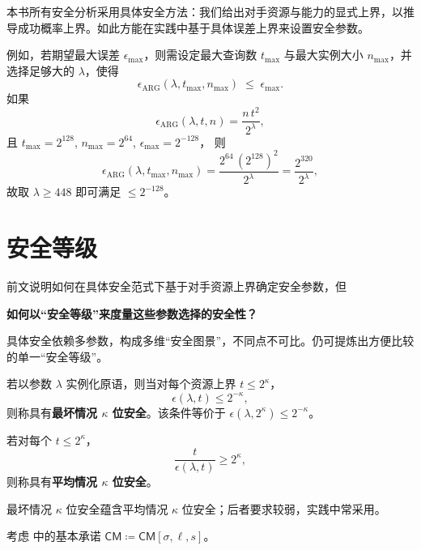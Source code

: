 \documentclass[american,singlepageview]{snargs-book-zh}
\newcommand{\DefineEqual}{\coloneqq}
\newcommand{\InstanceSize}{n}
\newcommand{\ProtoSoundnessError}{\epsilon}
\newcommand{\ARGSubscript}{\scriptscriptstyle\mathrm{ARG}}
\newcommand{\ARGSoundnessError}{\ProtoSoundnessError_{\ARGSubscript}}
\newcommand{\ROQueryBound}{t}
\newcommand{\SecurityParameter}{\lambda}
\newcommand{\ROOutputSize}{\sigma}
\newcommand{\SecurityLevel}{\kappa}
\newcommand{\ResourceBound}{t}
\newcommand{\ErrorBound}{\epsilon}
\newcommand{\CMSymbol}{\mathsf{CM}}
\newcommand{\CMConstructor}[3]{\CMSymbol[#1,#2,#3]}
\newcommand{\CMMessageLength}{\ell}
\newcommand{\CMSaltSize}{s}
\begin{document}
本书所有安全分析采用具体安全方法：我们给出对手资源与能力的显式上界，以推导成功概率上界。如此方能在实践中基于具体误差上界来设置安全参数。

例如，若期望最大误差 $\ErrorBound_{\max}$，则需设定最大查询数 $\ROQueryBound_{\max}$ 与最大实例大小 $\InstanceSize_{\max}$，并选择足够大的 $\SecurityParameter$，使得
\[
\ARGSoundnessError(\SecurityParameter,\ROQueryBound_{\max},\InstanceSize_{\max})
\;\le\;\ErrorBound_{\max}.
\]
如果
\[
\ARGSoundnessError(\SecurityParameter,\ROQueryBound,\InstanceSize)
=\frac{\InstanceSize\,\ROQueryBound^2}{2^{\SecurityParameter}},
\]
且
$\ROQueryBound_{\max}=2^{128}$,
$\InstanceSize_{\max}=2^{64}$,
$\ErrorBound_{\max}=2^{-128}$，
则
\[
\ARGSoundnessError(\SecurityParameter,\ROQueryBound_{\max},\InstanceSize_{\max})
=\frac{2^{64}\,(2^{128})^2}{2^{\SecurityParameter}}
=\frac{2^{320}}{2^{\SecurityParameter}},
\]
故取 $\SecurityParameter\ge448$ 即可满足 $\le2^{-128}$。

\section{安全等级}
\label{section:security-levels}

前文说明如何在具体安全范式下基于对手资源上界确定安全参数，但
\begin{center}
\textbf{如何以“安全等级”来度量这些参数选择的安全性？}
\end{center}

具体安全依赖多参数，构成多维“安全图景”，不同点不可比。仍可提炼出方便比较的单一“安全等级”。

若以参数 $\SecurityParameter$ 实例化原语，则当对每个资源上界 $\ResourceBound\le2^{\SecurityLevel}$，
\[
\ErrorBound(\SecurityParameter,\ResourceBound)\le2^{-\SecurityLevel},
\]
则称具有\textbf{最坏情况 $\SecurityLevel$ 位安全}。该条件等价于
$\ErrorBound(\SecurityParameter,2^{\SecurityLevel})\le2^{-\SecurityLevel}$。

若对每个 $\ResourceBound\le2^{\SecurityLevel}$，
\[
\frac{\ResourceBound}{\ErrorBound(\SecurityParameter,\ResourceBound)}
\ge2^{\SecurityLevel},
\]
则称具有\textbf{平均情况 $\SecurityLevel$ 位安全}。

最坏情况 $\SecurityLevel$ 位安全蕴含平均情况 $\SecurityLevel$ 位安全；后者要求较弱，实践中常采用。

考虑  中的基本承诺
$\CMSymbol\DefineEqual\CMConstructor{\ROOutputSize}{\CMMessageLength}{\CMSaltSize}$。
\end{document}
